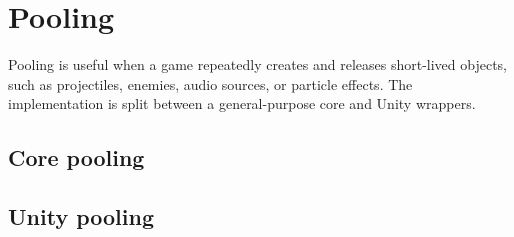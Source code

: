 \section{Pooling}
\label{sec:pooling}

Pooling is useful when a game repeatedly creates and releases short-lived objects, such as projectiles, enemies, audio sources, or particle effects. The implementation is split between a general-purpose core and Unity wrappers.

\subsection{Core pooling}


\subsection{Unity pooling}

